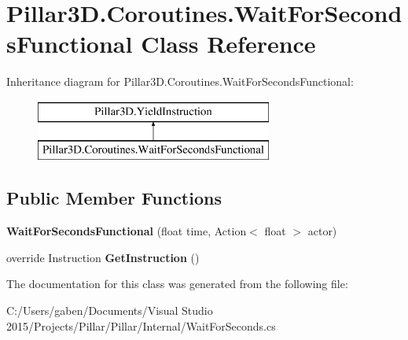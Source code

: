 \hypertarget{class_pillar3_d_1_1_coroutines_1_1_wait_for_seconds_functional}{}\section{Pillar3\+D.\+Coroutines.\+Wait\+For\+Seconds\+Functional Class Reference}
\label{class_pillar3_d_1_1_coroutines_1_1_wait_for_seconds_functional}
Inheritance diagram for Pillar3\+D.\+Coroutines.\+Wait\+For\+Seconds\+Functional\+:\begin{figure}[H]
\begin{center}
\leavevmode
\includegraphics[height=2.000000cm]{class_pillar3_d_1_1_coroutines_1_1_wait_for_seconds_functional}
\end{center}
\end{figure}
\subsection*{Public Member Functions}
\begin{DoxyCompactItemize}
\item 
\mbox{\label{class_pillar3_d_1_1_coroutines_1_1_wait_for_seconds_functional_a52fca86896bf2218d50f27b24ee2119c}} 
{\bfseries Wait\+For\+Seconds\+Functional} (float time, Action$<$ float $>$ actor)
\item 
\mbox{\label{class_pillar3_d_1_1_coroutines_1_1_wait_for_seconds_functional_aa14879cb65f6b98935b8cc7cd7bc7405}} 
override Instruction {\bfseries Get\+Instruction} ()
\end{DoxyCompactItemize}


The documentation for this class was generated from the following file\+:\begin{DoxyCompactItemize}
\item 
C\+:/\+Users/gaben/\+Documents/\+Visual Studio 2015/\+Projects/\+Pillar/\+Pillar/\+Internal/Wait\+For\+Seconds.\+cs\end{DoxyCompactItemize}

